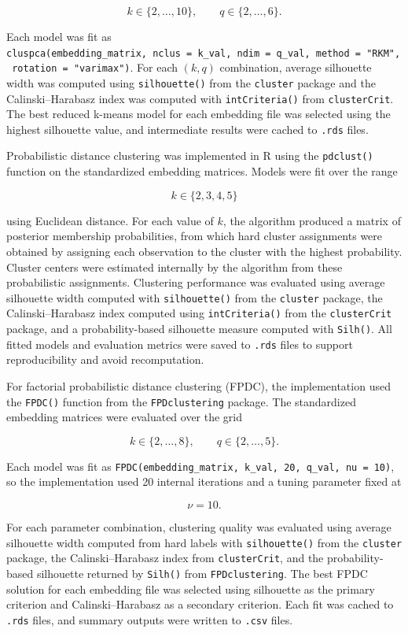\documentclass[
  11pt,
]{article}
\begin{document}
\[
k \in \{2,\dots,10\}, \qquad q \in \{2,\dots,6\}.
\]

Each model was fit as
\texttt{cluspca(embedding\_matrix,\ nclus\ =\ k\_val,\ ndim\ =\ q\_val,\ method\ =\ "RKM",\ rotation\ =\ "varimax")}.
For each \((k,q)\) combination, average silhouette width was computed
using \texttt{silhouette()} from the \texttt{cluster} package and the
Calinski--Harabasz index was computed with \texttt{intCriteria()} from
\texttt{clusterCrit}. The best reduced k-means model for each embedding
file was selected using the highest silhouette value, and intermediate
results were cached to \texttt{.rds} files.

Probabilistic distance clustering was implemented in R using the
\texttt{pdclust()} function on the standardized embedding matrices.
Models were fit over the range

\[
k \in \{2,3,4,5\}
\]

using Euclidean distance. For each value of \(k\), the algorithm
produced a matrix of posterior membership probabilities, from which hard
cluster assignments were obtained by assigning each observation to the
cluster with the highest probability. Cluster centers were estimated
internally by the algorithm from these probabilistic assignments.
Clustering performance was evaluated using average silhouette width
computed with \texttt{silhouette()} from the \texttt{cluster} package,
the Calinski--Harabasz index computed using \texttt{intCriteria()} from
the \texttt{clusterCrit} package, and a probability-based silhouette
measure computed with \texttt{Silh()}. All fitted models and evaluation
metrics were saved to \texttt{.rds} files to support reproducibility and
avoid recomputation.

For factorial probabilistic distance clustering (FPDC), the
implementation used the \texttt{FPDC()} function from the
\texttt{FPDclustering} package. The standardized embedding matrices were
evaluated over the grid

\[
k \in \{2,\dots,8\}, \qquad q \in \{2,\dots,5\}.
\]

Each model was fit as
\texttt{FPDC(embedding\_matrix,\ k\_val,\ 20,\ q\_val,\ nu\ =\ 10)}, so
the implementation used 20 internal iterations and a tuning parameter
fixed at

\[
\nu = 10.
\]

For each parameter combination, clustering quality was evaluated using
average silhouette width computed from hard labels with
\texttt{silhouette()} from the \texttt{cluster} package, the
Calinski--Harabasz index from \texttt{clusterCrit}, and the
probability-based silhouette returned by \texttt{Silh()} from
\texttt{FPDclustering}. The best FPDC solution for each embedding file
was selected using silhouette as the primary criterion and
Calinski--Harabasz as a secondary criterion. Each fit was cached to
\texttt{.rds} files, and summary outputs were written to \texttt{.csv}
files.
\end{document}
